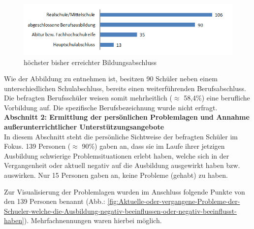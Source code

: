\begin{figure}[ht]
	\centering
		\includegraphics[width=1.0\textwidth]{images/Hoechster-bisher-erreichter-Bildungsabschluss.png}
	\caption{höchster bisher erreichter Bildungsabschluss}
	\label{fig:Hoechster-bisher-erreichter-Bildungsabschluss}
\end{figure}

\noindent
Wie der Abbildung zu entnehmen ist, besitzen 90 Schüler neben einem unterschiedlichen Schulabschluss, bereits einen weiterführenden Berufsabschluss. Die befragten Berufsschüler weisen somit mehrheitlich ($\approx$ 58,4\%) eine berufliche Vorbildung auf. Die spezifische Berufsbezeichnung wurde nicht erfragt.\\

\noindent
\textbf{Abschnitt 2: Ermittlung der persönlichen Problemlagen und Annahme außerunterrichtlicher Unterstützungsangebote}\\

\noindent
In diesem Abschnitt steht die persönliche Sichtweise der befragten Schüler im Fokus. 139 Personen ($\approx$ 90\%) gaben an, dass sie im Laufe ihrer jetzigen Ausbildung schwierige Problemsituationen erlebt haben, welche sich in der Vergangenheit oder aktuell negativ auf die Ausbildung ausgewirkt haben bzw. auswirken. Nur 15 Personen gaben an, keine Probleme (gehabt) zu haben. 

Zur Visualisierung der Problemlagen wurden im Anschluss folgende Punkte von den 139 Personen benannt (Abb.: \ref{fig:Aktuelle-oder-vergangene-Probleme-der-Schueler-welche-die-Ausbildung-negativ-beeinflussen-oder-negativ-beeinflusst-haben}). Mehrfachnennungen waren hierbei möglich. 


